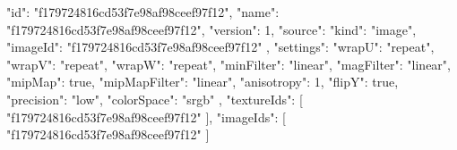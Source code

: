 {
  "id": "f179724816cd53f7e98af98ceef97f12",
  "name": "f179724816cd53f7e98af98ceef97f12",
  "version": 1,
  "source": {
    "kind": "image",
    "imageId": "f179724816cd53f7e98af98ceef97f12"
  },
  "settings": {
    "wrapU": "repeat",
    "wrapV": "repeat",
    "wrapW": "repeat",
    "minFilter": "linear",
    "magFilter": "linear",
    "mipMap": true,
    "mipMapFilter": "linear",
    "anisotropy": 1,
    "flipY": true,
    "precision": "low",
    "colorSpace": "srgb"
  },
  "textureIds": [
    "f179724816cd53f7e98af98ceef97f12"
  ],
  "imageIds": [
    "f179724816cd53f7e98af98ceef97f12"
  ]
}
